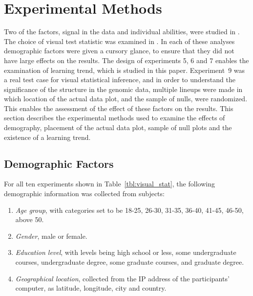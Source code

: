 \documentclass[10pt]{article}\usepackage[]{graphicx}\usepackage[]{xcolor}
\begin{document}

\appendix


\section{Experimental Methods}\label{sec:exp_design}

Two of the factors, signal in the data and individual abilities, were studied in \cite{majumder:2013}. The choice of visual test statistic was examined in \cite{heike:2012}. In each of these analyses demographic factors were given a cursory glance, to ensure that they did not have large effects on the results. The design of experiments 5, 6 and 7 enables the examination of learning trend, which is studied in this paper. Experiment~9 was a real test case for visual statistical inference, and in order to understand the significance of the structure in the genomic data, multiple lineups were made in which location of the actual data plot, and the sample of nulls, were randomized. This enables the assessment of the effect of these factors on the results. This section describes the experimental methods used to examine the effects of demography, placement of the actual data plot, sample of null plots and the existence of a learning trend. 

\subsection{Demographic Factors}
\noindent
For all  ten experiments shown in Table~\ref{tbl:visual_stat}, the following demographic information was collected from subjects:

\begin{enumerate} \leftmargin 5cm  \itemsep 0in
\item {\it Age group}, with categories set to be 18-25, 26-30, 31-35, 36-40, 41-45, 46-50, above 50.
\item {\it Gender}, male or female.
\item {\it Education level}, with levels being high school or less, some undergraduate courses, undergraduate degree, some graduate courses, and graduate degree.
\item {\it Geographical location}, collected from the IP address of the participants' computer, as latitude, longitude, city and country. 
\end{enumerate}
\end{document}
